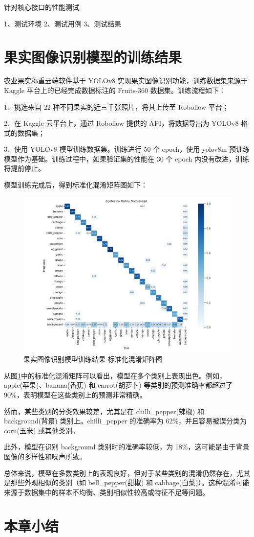 针对核心接口的性能测试

1、测试环境
2、测试用例
3、测试结果

\section{果实图像识别模型的训练结果}\label{sec:test-model}

农业果实称重云端软件基于 YOLOv8 实现果实图像识别功能，训练数据集来源于 Kaggle 平台上的已经完成数据标注的 Fruits-360 数据集。训练流程如下：

1、挑选来自 22 种不同果实的近三千张照片，将其上传至 Roboflow 平台；

2、在 Kaggle 云平台上，通过 Roboflow 提供的 API，将数据导出为 YOLOv8 格式的数据集；

3、使用 YOLOv8 模型训练数据集。训练进行 50 个 epoch，使用 yolov8m 预训练模型作为基础。训练过程中，如果验证集的性能在 30 个 epoch 内没有改进，训练将提前停止。

模型训练完成后，得到标准化混淆矩阵图如下：

\begin{figure}[H]
    \centering
    \includegraphics[width=0.8\linewidth]{../source/aws-img/yolov8/out/image/confusion_matrix_normalized.png}
    \caption{果实图像识别模型训练结果-标准化混淆矩阵图}
    \label{fig:confusion_matrix_normalized}
\end{figure}

从图\ref{fig:confusion_matrix_normalized}中的标准化混淆矩阵可以看出，模型在多个类别上表现出色。例如，apple(苹果)、banana(香蕉) 和 carrot(胡萝卜) 等类别的预测准确率都超过了 90\%，表明模型在这些类别上的预测非常精确。

然而，某些类别的分类效果较差，尤其是在 chilli\_pepper(辣椒) 和 background(背景) 类别上。chilli\_pepper 的准确率为 62\%，并且容易被误分类为 corn(玉米) 或其他类别。

此外，模型在识别 background 类别时的准确率较低，为 18\%，这可能是由于背景图像的多样性和噪声所致。

总体来说，模型在多数类别上的表现良好，但对于某些类别的混淆仍然存在，尤其是那些外观相似的类别（如 bell\_pepper(甜椒) 和 cabbage(白菜)）。这种混淆可能来源于数据集中的样本不均衡、类别相似性较高或特征不足等问题。

\section{本章小结}